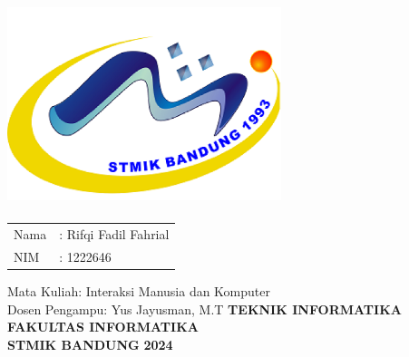 \begin{spacing}{1}
  \maketitle
  \thispagestyle{empty}
  \begin{center}
  \includegraphics[width=8cm,height=6cm]{./images/logo.png}
  \end{center}
  \vspace{0.5 cm}
  \begin{center}
  \begin{tabular}{ll}
  Nama & : Rifqi Fadil Fahrial \\
  NIM & : 1222646\\
  \end{tabular}
  \newline
  \linebreak
  \linebreak
  Mata Kuliah: Interaksi Manusia dan Komputer\\
  Dosen Pengampu: Yus Jayusman, M.T\linebreak
  \newline
  \newline
  \newline
  \newline
  \textbf {TEKNIK INFORMATIKA} \\
  \textbf {FAKULTAS INFORMATIKA} \\
  \textbf {STMIK BANDUNG}
  \linebreak
  \textbf {2024} \linebreak
  \end{center}
\end{spacing}
\pagebreak

